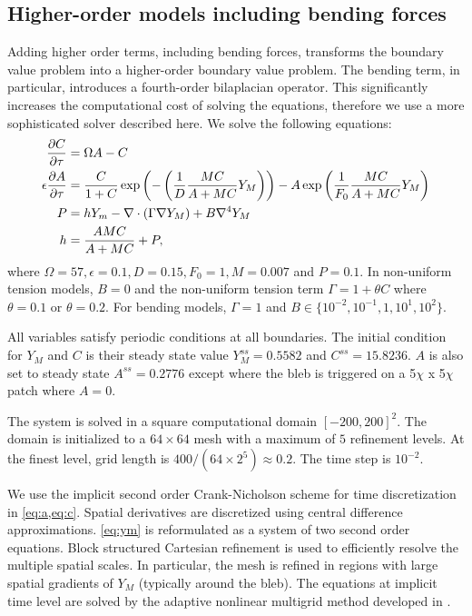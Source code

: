 \subsection{Higher-order models including bending forces}
Adding higher order terms, including bending forces, transforms the boundary value problem into a higher-order boundary value problem. The bending term, in particular, introduces a fourth-order bilaplacian operator. This significantly increases the computational cost of solving the equations, therefore we use a more sophisticated solver described here. 
We solve the following equations:
\begin{align}
\displaystyle{\frac{{\partial C}}{{\partial \tau}}}&=\Omega A-C \label{eq:c} \\
\epsilon \displaystyle{\frac{{\partial A}}{{\partial \tau}}}&=\displaystyle{\frac{{C}}{{1+C}}} \exp\left(-\left(\displaystyle{\frac{{1}}{{D}}}\displaystyle{\frac{{MC}}{{A+MC}}}Y_M\right)\right)-A\exp\left(\displaystyle{\frac{{1}}{{F_0}}}\displaystyle{\frac{{MC}}{{A+MC}}}Y_M\right) \label{eq:a} \\
P&=hY_m-\nabla\cdot(\Gamma\nabla Y_M)+B\nabla^4 Y_M \label{eq:ym} \\
h&=\displaystyle{\frac{{AMC}}{{A+MC}}}+P \label{eq:h},
\end{align}
where $\Omega=57,\epsilon=0.1,D=0.15,F_0=1,M=0.007$ and $P=0.1$. In non-uniform tension models, $B=0$ and the non-uniform tension term $\Gamma=1+\theta C$ where $\theta=0.1$ or $\theta=0.2$. For bending models, $\Gamma=1$ and $B\in\{10^{-2},10^{-1},1,10^1,10^2\}$.

All variables satisfy periodic conditions at all boundaries. The initial condition for $Y_M$ and $C$ is their steady state value $Y_M^{ss}=0.5582$ and $C^{ss}=15.8236$. $A$ is also set to steady state $A^{ss}=0.2776$ except where the bleb is triggered on a 5$\chi$ x 5$\chi$ patch where $A=0$.

The system is solved in a square computational domain $[-200,200]^2$. The domain is initialized to a $64\times 64$ mesh with a maximum of $5$ refinement levels. At the finest level, grid length is $400/(64\times 2^5)\approx 0.2$. The time step is $10^{-2}$.

We use the implicit second order Crank-Nicholson scheme for time discretization in \cref{eq:a,eq:c}. Spatial derivatives are discretized using central difference approximations. \cref{eq:ym} is reformulated as a system of two second order equations. Block structured Cartesian refinement is used to efficiently resolve the multiple spatial scales. In particular, the mesh is refined in regions with large spatial gradients of $Y_M$ (typically around the bleb). The equations at implicit time level are solved by the adaptive nonlinear multigrid method developed in \cite{wise07}.



